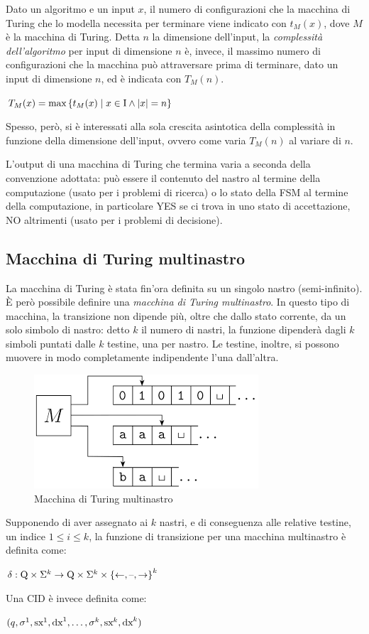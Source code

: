 Dato un algoritmo e un input $x$, il numero di configurazioni che la macchina di Turing che lo modella necessita per terminare viene indicato con $t_M (x)$, dove $M$ è la macchina di Turing.
Detta $n$ la dimensione dell'input, la \textit{complessità dell'algoritmo} per input di dimensione $n$ è, invece, il massimo numero di configurazioni che la macchina può attraversare prima di terminare, dato un input di dimensione $n$, ed è indicata con $T_M (n)$.
\begin{center}
    $T_M (x) = \textnormal{max} \left\{ t_M (x) \; | \; x \in \textnormal{I} \land |x| = n \right\}$
\end{center}
Spesso, però, si è interessati alla sola crescita asintotica della complessità in funzione della dimensione dell'input, ovvero come varia $T_M (n)$ al variare di $n$.

L'output di una macchina di Turing che termina varia a seconda della convenzione adottata: può essere il contenuto del nastro al termine della computazione (usato per i problemi di ricerca) o lo stato della FSM al termine della computazione, in particolare YES se ci trova in uno stato di accettazione, NO altrimenti (usato per i problemi di decisione).

\subsection*{Macchina di Turing multinastro}
La macchina di Turing è stata fin'ora definita su un singolo nastro (semi-infinito).
È però possibile definire una \textit{macchina di Turing multinastro}.
In questo tipo di macchina, la transizione non dipende più, oltre che dallo stato corrente, da un solo simbolo di nastro: detto $k$ il numero di nastri, la funzione dipenderà dagli $k$ simboli puntati dalle $k$ testine, una per nastro. Le testine, inoltre, si possono muovere in modo completamente indipendente l'una dall'altra.
\begin{figure}[h]
    \centering
    \includegraphics[width=0.5\linewidth]{img/multitape_turing_machine.png}
    \caption{Macchina di Turing multinastro}
    \label{fig:multitape-turing-machine}
\end{figure}
Supponendo di aver assegnato ai $k$ nastri, e di conseguenza alle relative testine, un indice $1 \le i \le k$, la funzione di transizione per una macchina multinastro è definita come:
\begin{center}
    $\delta: \textnormal{Q} \times \Sigma^k \rightarrow \textnormal{Q} \times \Sigma^k \times \left\{ \leftarrow, \textnormal{\textendash}, \rightarrow \right\}^k$
\end{center}
Una CID è invece definita come:
\begin{center}
    $(q, \sigma^1, \textnormal{sx}^1, \textnormal{dx}^1, \ldots, \sigma^k, \textnormal{sx}^k, \textnormal{dx}^k)$
\end{center}


